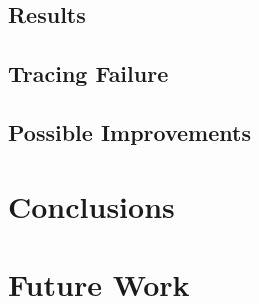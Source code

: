     \subsection{Results}
    \subsection{Tracing Failure}
    
    \subsection{Possible Improvements}
    
 
\newpage   
\section{Conclusions}\label{chap:conclusions}
\newpage
\section{Future Work}




